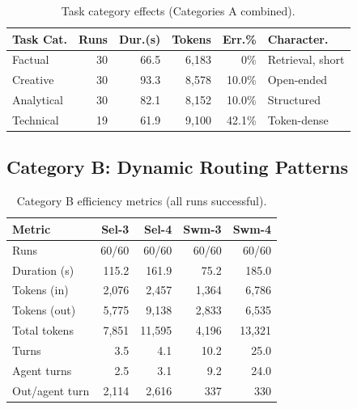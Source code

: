 \documentclass{article}
\begin{document}
\begin{table}[H]
\centering
\caption{Task category effects (Categories A combined).}
\label{tab:task_effects}
{\small
\begin{tabular}{@{}lrrrrl@{}}
\toprule
\textbf{Task Cat.} & \textbf{Runs} & \textbf{Dur.(s)} & \textbf{Tokens} & \textbf{Err.\%} & \textbf{Character.} \\
\midrule
Factual & 30 & 66.5 & 6,183 & 0\% & Retrieval, short \\
Creative & 30 & 93.3 & 8,578 & 10.0\% & Open-ended \\
Analytical & 30 & 82.1 & 8,152 & 10.0\% & Structured \\
Technical & 19 & 61.9 & 9,100 & 42.1\% & Token-dense \\
\bottomrule
\end{tabular}
}
\end{table}

\subsection{Category B: Dynamic Routing Patterns}

\begin{table}[H]
\centering
\caption{Category B efficiency metrics (all runs successful).}
\label{tab:catB}
{\small
\begin{tabular}{@{}lrrrr@{}}
\toprule
\textbf{Metric} & \textbf{Sel-3} & \textbf{Sel-4} & \textbf{Swm-3} & \textbf{Swm-4} \\
\midrule
Runs & 60/60 & 60/60 & 60/60 & 60/60 \\
Duration (s) & 115.2 & 161.9 & 75.2 & 185.0 \\
Tokens (in) & 2,076 & 2,457 & 1,364 & 6,786 \\
Tokens (out) & 5,775 & 9,138 & 2,833 & 6,535 \\
Total tokens & 7,851 & 11,595 & 4,196 & 13,321 \\
Turns & 3.5 & 4.1 & 10.2 & 25.0 \\
Agent turns & 2.5 & 3.1 & 9.2 & 24.0 \\
Out/agent turn & 2,114 & 2,616 & 337 & 330 \\
\bottomrule
\end{tabular}
}
\end{table}
\end{document}
